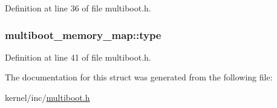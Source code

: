 Definition at line 36 of file multiboot.\-h.

\hypertarget{structmultiboot__memory__map_a4e1768afd1cc4042b2d202c6e880cb70}{
\subsubsection[{type}]{ multiboot\-\_\-memory\-\_\-map\-::type}}\label{structmultiboot__memory__map_a4e1768afd1cc4042b2d202c6e880cb70}


Definition at line 41 of file multiboot.\-h.



The documentation for this struct was generated from the following file\-:\begin{DoxyCompactItemize}
\item 
kernel/inc/\hyperlink{multiboot_8h}{multiboot.\-h}\end{DoxyCompactItemize}
